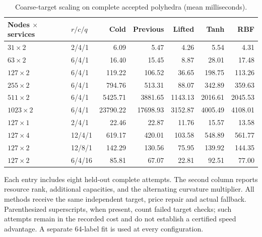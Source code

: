 \documentclass[11pt,letterpaper]{article}
\theoremstyle{definition}
\newcommand{\1}{\mathbf 1}
\begin{document}
\begin{table}[tbp]\centering\small
\caption{Coarse-target scaling on complete accepted polyhedra (mean milliseconds).}\label{tab:r22-scaling-coarse}
\begin{tabular}{llrrrrr}
\toprule
Nodes $\times$ services & $r/c/q$ & Cold & Previous & Lifted & Tanh & RBF\\
\midrule
$31\times 2$ & 2/4/1 & 6.09 & 5.47 & 4.26 & 5.54 & 4.31\\
$63\times 2$ & 6/4/1 & 16.40 & 15.45 & 8.87 & 28.01 & 17.48\\
$127\times 2$ & 6/4/1 & 119.22 & 106.52 & 36.65 & 198.75 & 113.26\\
$255\times 2$ & 6/4/1 & 794.76 & 513.31 & 88.07 & 342.89 & 359.63\\
$511\times 2$ & 6/4/1 & 5425.71 & 3881.65 & 1143.13 & 2016.61 & 2045.53\\
$1023\times 2$ & 6/4/1 & 23790.22 & 17698.93 & 3152.87 & 4005.49 & 4108.01\\
$127\times 1$ & 2/4/1 & 22.46 & 22.87 & 11.76 & 15.57 & 13.58\\
$127\times 4$ & 12/4/1 & 619.17 & 420.01 & 103.58 & 548.89 & 561.77\\
$127\times 2$ & 12/8/1 & 142.29 & 130.56 & 75.95 & 139.92 & 144.35\\
$127\times 2$ & 6/4/16 & 85.81 & 67.07 & 22.81 & 92.51 & 77.00\\
\bottomrule
\end{tabular}
\par\smallskip\begin{minipage}{.98\textwidth}\small Each entry includes eight held-out complete attempts. The second column reports resource rank, additional capacities, and the alternating curvature multiplier. All methods receive the same independent target, price repair and actual fallback. Parenthesized superscripts, when present, count failed target checks; such attempts remain in the recorded cost and do not establish a certified speed advantage. A separate 64-label fit is used at every configuration.\end{minipage}
\end{table}

\end{document}
